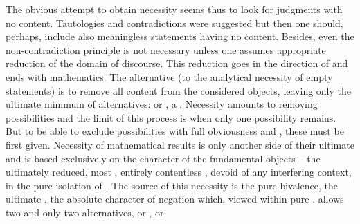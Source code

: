 \pa The obvious attempt to obtain necessity seems thus to look for judgments
with no content. Tautologies and contradictions were suggested but then one
should, perhaps, include also meaningless statements having no content. Besides,
even the non-contradiction principle is not necessary unless one assumes
appropriate reduction of the domain of discourse. This reduction goes in the
direction of  and ends with mathematics. The alternative (to the
analytical necessity of empty statements) is to remove all content from the
considered objects, leaving only the ultimate minimum of 
alternatives:  or , a . Necessity amounts
to removing possibilities and the limit of this process is when only one
possibility remains. But to be able to exclude possibilities with full obviousness and
, these must be first  given.  Necessity of
mathematical results is only another side of their ultimate  and
is based exclusively on the character of the fundamental objects -- the
ultimately reduced, most , entirely contentless , devoid of any interfering context, in the pure isolation of
. The source of this necessity is the pure
bivalence, the ultimate , the absolute character of
negation which, viewed within pure , allows two and only two
alternatives,  or ,  or
